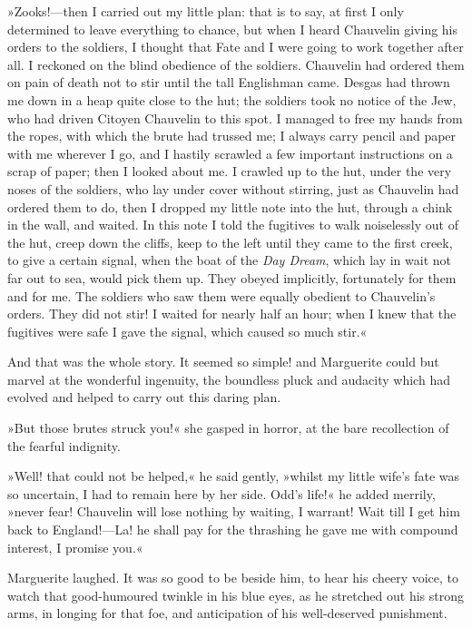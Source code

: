 »Zooks!\allowbreak---\allowbreak then I carried out my little plan: that is to say, at first I only determined to leave everything to chance, but when I heard Chauvelin giving his orders to the soldiers, I thought that Fate and I were going to work together after all. I reckoned on the blind obedience of the soldiers. Chauvelin had ordered them on pain of death not to stir until the tall Englishman came. Desgas had thrown me down in a heap quite close to the hut; the soldiers took no notice of the Jew, who had driven Citoyen Chauvelin to this spot. I managed to free my hands from the ropes, with which the brute had trussed me; I always carry pencil and paper with me wherever I go, and I hastily scrawled a few important instructions on a scrap of paper; then I looked about me. I crawled up to the hut, under the very noses of the soldiers, who lay under cover without stirring, just as Chauvelin had ordered them to do, then I dropped my little note into the hut, through a chink in the wall, and waited. In this note I told the fugitives to walk noiselessly out of the hut, creep down the cliffs, keep to the left until they came to the first creek, to give a certain signal, when the boat of the \textit{Day Dream}, which lay in wait not far out to sea, would pick them up. They obeyed implicitly, fortunately for them and for me. The soldiers who saw them were equally obedient to Chauvelin's orders. They did not stir! I waited for nearly half an hour; when I knew that the fugitives were safe I gave the signal, which caused so much stir.«

And that was the whole story. It seemed so simple! and Marguerite could but marvel at the wonderful ingenuity, the boundless pluck and audacity which had evolved and helped to carry out this daring plan.

»But those brutes struck you!« she gasped in horror, at the bare recollection of the fearful indignity.

»Well! that could not be helped,« he said gently, »whilst my little wife's fate was so uncertain, I had to remain here by her side. Odd's life!« he added merrily, »never fear! Chauvelin will lose nothing by waiting, I warrant! Wait till I get him back to England!\allowbreak---\allowbreak La! he shall pay for the thrashing he gave me with compound interest, I promise you.«

Marguerite laughed. It was so good to be beside him, to hear his cheery voice, to watch that good-humoured twinkle in his blue eyes, as he stretched out his strong arms, in longing for that foe, and anticipation of his well-deserved punishment.

